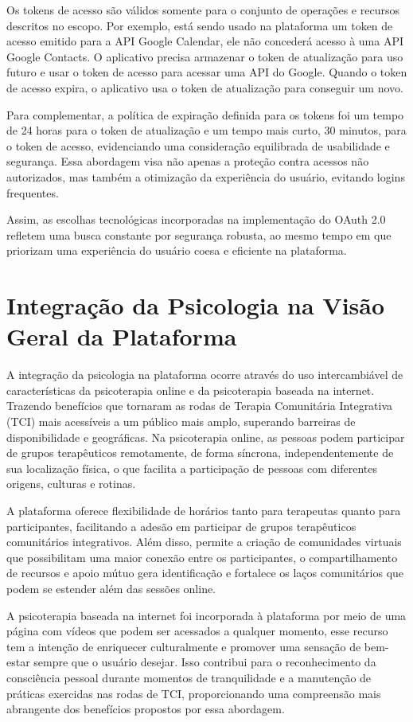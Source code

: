 Os tokens de acesso são válidos somente para o conjunto de operações e recursos descritos no escopo. Por exemplo, está sendo usado na plataforma um token de acesso emitido para a API Google Calendar, ele não concederá acesso à uma API Google Contacts. O aplicativo precisa armazenar o token de atualização para uso futuro e usar o token de acesso para acessar uma API do Google. Quando o token de acesso expira, o aplicativo usa o token de atualização para conseguir um novo.

Para complementar, a política de expiração definida para os tokens foi um tempo de 24 horas para o token de atualização e um tempo mais curto, 30 minutos, para o token de acesso, evidenciando uma consideração equilibrada de usabilidade e segurança. Essa abordagem visa não apenas a proteção contra acessos não autorizados, mas também a otimização da experiência do usuário, evitando logins frequentes.

Assim, as escolhas tecnológicas incorporadas na implementação do OAuth 2.0 refletem uma busca constante por segurança robusta, ao mesmo tempo em que priorizam uma experiência do usuário coesa e eficiente na plataforma.


\chapter{Integração da Psicologia na Visão Geral da Plataforma}

A integração da psicologia na plataforma ocorre através do uso intercambiável de características da psicoterapia online e da psicoterapia baseada na internet. Trazendo benefícios que tornaram as rodas de Terapia Comunitária Integrativa (TCI) mais acessíveis a um público mais amplo, superando barreiras de disponibilidade e geográficas. Na psicoterapia online, as pessoas podem participar de grupos terapêuticos remotamente, de forma síncrona, independentemente de sua localização física, o que facilita a participação de pessoas com diferentes origens, culturas e rotinas.

A plataforma oferece flexibilidade de horários tanto para terapeutas quanto para participantes, facilitando a adesão em participar de grupos terapêuticos comunitários integrativos. Além disso, permite a criação de comunidades virtuais que possibilitam uma maior conexão entre os participantes, o compartilhamento de recursos e apoio mútuo gera identificação e fortalece os laços comunitários que podem se estender além das sessões online.

A psicoterapia baseada na internet foi incorporada à plataforma por meio de uma página com vídeos que podem ser acessados a qualquer momento, esse recurso tem a intenção de enriquecer culturalmente e promover uma sensação de bem-estar sempre que o usuário desejar. Isso contribui para o reconhecimento da consciência pessoal durante momentos de tranquilidade e a manutenção de práticas exercidas nas rodas de TCI, proporcionando uma compreensão mais abrangente dos benefícios propostos por essa abordagem.

